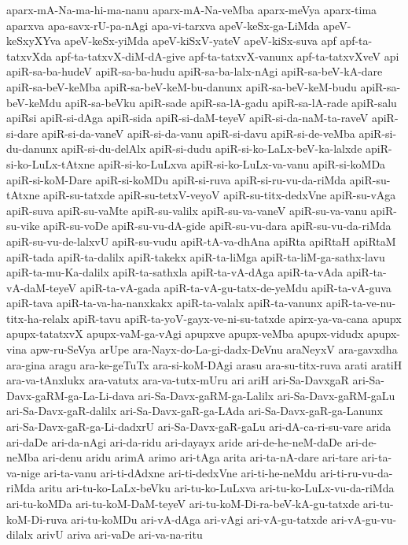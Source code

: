 {aparx-mA-Na-ma-hi-ma-nanu
aparx-mA-Na-veMba
aparx-meVya
aparx-tima
aparxva
apa-savx-rU-pa-nAgi
apa-vi-tarxva
apeV-keSx-ga-LiMda
apeV-keSxyXYva
apeV-keSx-yiMda
apeV-kiSxV-yateV
apeV-kiSx-suva
apf
apf-ta-tatxvXda
apf-ta-tatxvX-diM-dA-give
apf-ta-tatxvX-vanunx
apf-ta-tatxvXveV
api
apiR-sa-ba-hudeV
apiR-sa-ba-hudu
apiR-sa-ba-lalx-nAgi
apiR-sa-beV-kA-dare
apiR-sa-beV-keMba
apiR-sa-beV-keM-bu-danunx
apiR-sa-beV-keM-budu
apiR-sa-beV-keMdu
apiR-sa-beVku
apiR-sade
apiR-sa-lA-gadu
apiR-sa-lA-rade
apiR-salu
apiRsi
apiR-si-dAga
apiR-sida
apiR-si-daM-teyeV
apiR-si-da-naM-ta-raveV
apiR-si-dare
apiR-si-da-vaneV
apiR-si-da-vanu
apiR-si-davu
apiR-si-de-veMba
apiR-si-du-danunx
apiR-si-du-delAlx
apiR-si-dudu
apiR-si-ko-LaLx-beV-ka-lalxde
apiR-si-ko-LuLx-tAtxne
apiR-si-ko-LuLxva
apiR-si-ko-LuLx-va-vanu
apiR-si-koMDa
apiR-si-koM-Dare
apiR-si-koMDu
apiR-si-ruva
apiR-si-ru-vu-da-riMda
apiR-su-tAtxne
apiR-su-tatxde
apiR-su-tetxV-veyoV
apiR-su-titx-dedxVne
apiR-su-vAga
apiR-suva
apiR-su-vaMte
apiR-su-valilx
apiR-su-va-vaneV
apiR-su-va-vanu
apiR-su-vike
apiR-su-voDe
apiR-su-vu-dA-gide
apiR-su-vu-dara
apiR-su-vu-da-riMda
apiR-su-vu-de-lalxvU
apiR-su-vudu
apiR-tA-va-dhAna
apiRta
apiRtaH
apiRtaM
apiR-tada
apiR-ta-dalilx
apiR-takekx
apiR-ta-liMga
apiR-ta-liM-ga-sathx-lavu
apiR-ta-mu-Ka-dalilx
apiR-ta-sathxla
apiR-ta-vA-dAga
apiR-ta-vAda
apiR-ta-vA-daM-teyeV
apiR-ta-vA-gada
apiR-ta-vA-gu-tatx-de-yeMdu
apiR-ta-vA-guva
apiR-tava
apiR-ta-va-ha-nanxkakx
apiR-ta-valalx
apiR-ta-vanunx
apiR-ta-ve-nu-titx-ha-relalx
apiR-tavu
apiR-ta-yoV-gayx-ve-ni-su-tatxde
apirx-ya-va-cana
apupx
apupx-tatatxvX
apupx-vaM-ga-vAgi
apupxve
apupx-veMba
apupx-vidudx
apupx-vina
apw-ru-SeVya
arUpe
ara-Nayx-do-La-gi-dadx-DeVnu
araNeyxV
ara-gavxdha
ara-gina
aragu
ara-ke-geTuTx
ara-si-koM-DAgi
arasu
ara-su-titx-ruva
arati
aratiH
ara-va-tAnxlukx
ara-vatutx
ara-va-tutx-mUru
ari
ariH
ari-Sa-DavxgaR
ari-Sa-Davx-gaRM-ga-La-Li-dava
ari-Sa-Davx-gaRM-ga-Lalilx
ari-Sa-Davx-gaRM-gaLu
ari-Sa-Davx-gaR-dalilx
ari-Sa-Davx-gaR-ga-LAda
ari-Sa-Davx-gaR-ga-Lanunx
ari-Sa-Davx-gaR-ga-Li-dadxrU
ari-Sa-Davx-gaR-gaLu
ari-dA-ca-ri-su-vare
arida
ari-daDe
ari-da-nAgi
ari-da-ridu
ari-dayayx
aride
ari-de-he-neM-daDe
ari-de-neMba
ari-denu
aridu
arimA
arimo
ari-tAga
arita
ari-ta-nA-dare
ari-tare
ari-ta-va-nige
ari-ta-vanu
ari-ti-dAdxne
ari-ti-dedxVne
ari-ti-he-neMdu
ari-ti-ru-vu-da-riMda
aritu
ari-tu-ko-LaLx-beVku
ari-tu-ko-LuLxva
ari-tu-ko-LuLx-vu-da-riMda
ari-tu-koMDa
ari-tu-koM-DaM-teyeV
ari-tu-koM-Di-ra-beV-kA-gu-tatxde
ari-tu-koM-Di-ruva
ari-tu-koMDu
ari-vA-dAga
ari-vAgi
ari-vA-gu-tatxde
ari-vA-gu-vu-dilalx
arivU
ariva
ari-vaDe
ari-va-na-ritu
}
